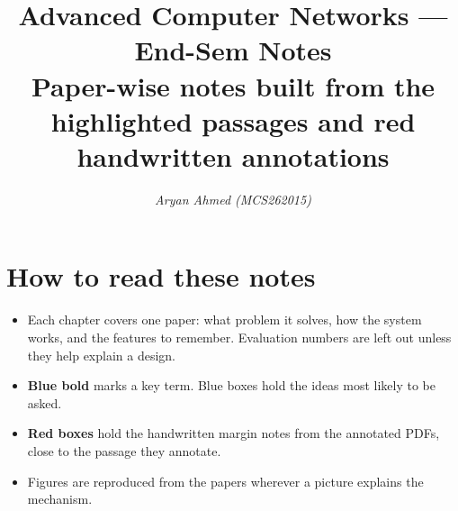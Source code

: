 \documentclass[11pt,a4paper]{report}
\title{\textbf{Advanced Computer Networks --- End-Sem Notes}\\[4pt]
\large Paper-wise notes built from the highlighted passages and red handwritten annotations}
\author{\textit{Aryan Ahmed (MCS262015)}}
\date{}
\newcommand{\key}[1]{\textbf{\color{blue!55!black}#1}}
\begin{document}
\maketitle

\section*{How to read these notes}
\begin{itemize}
  \item Each chapter covers one paper: what problem it solves, how the system works, and the features to remember. Evaluation numbers are left out unless they help explain a design.
  \item \key{Blue bold} marks a key term. Blue boxes hold the ideas most likely to be asked.
  \item \textcolor{red!60!black}{\textbf{Red boxes}} hold the handwritten margin notes from the annotated PDFs, close to the passage they annotate.
  \item Figures are reproduced from the papers wherever a picture explains the mechanism.
\end{itemize}

\tableofcontents































\end{document}
